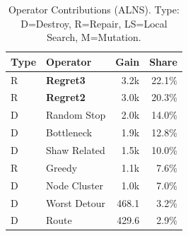 \begin{table}[t]
\centering
\caption{Operator Contributions (ALNS). Type: D=Destroy, R=Repair, LS=Local Search, M=Mutation.}
\label{tab:operators}
\begin{tabular}{llrr}
\toprule
\textbf{Type} & \textbf{Operator} & \textbf{Gain} & \textbf{Share} \\
\midrule
R & \textbf{Regret3} & 3.2k & 22.1\% \\
R & \textbf{Regret2} & 3.0k & 20.3\% \\
D & Random Stop & 2.0k & 14.0\% \\
D & Bottleneck & 1.9k & 12.8\% \\
D & Shaw Related & 1.5k & 10.0\% \\
R & Greedy & 1.1k & 7.6\% \\
D & Node Cluster & 1.0k & 7.0\% \\
D & Worst Detour & 468.1 & 3.2\% \\
D & Route & 429.6 & 2.9\% \\
\bottomrule
\end{tabular}
\end{table}